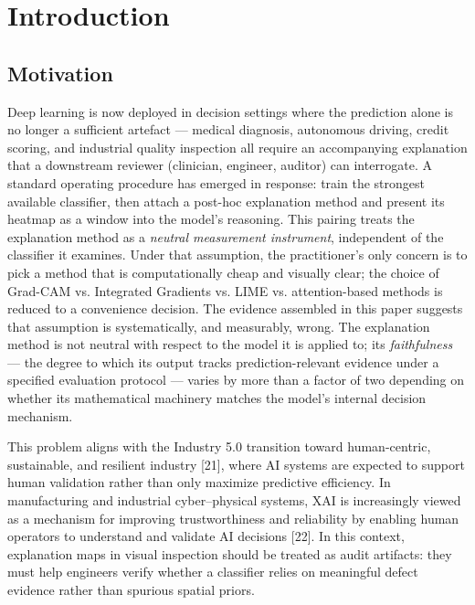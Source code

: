 \documentclass[11pt,a4paper]{article}
\begin{document}
\section{Introduction}

\subsection{Motivation}

Deep learning is now deployed in decision settings where the prediction alone is no longer a sufficient artefact --- medical diagnosis, autonomous driving, credit scoring, and industrial quality inspection all require an accompanying explanation that a downstream reviewer (clinician, engineer, auditor) can interrogate. A standard operating procedure has emerged in response: train the strongest available classifier, then attach a post-hoc explanation method and present its heatmap as a window into the model's reasoning. This pairing treats the explanation method as a \emph{neutral measurement instrument}, independent of the classifier it examines. Under that assumption, the practitioner's only concern is to pick a method that is computationally cheap and visually clear; the choice of Grad-CAM vs. Integrated Gradients vs. LIME vs. attention-based methods is reduced to a convenience
decision. The evidence assembled in this paper suggests that assumption is systematically, and measurably, wrong. The explanation method is not neutral with respect to the model it is applied to; its \emph{faithfulness} --- the degree to which its output tracks prediction-relevant evidence under a specified evaluation protocol --- varies by more than a factor of two depending on whether its mathematical machinery matches the model's internal decision mechanism.

This problem aligns with the Industry 5.0 transition toward human-centric, sustainable, and resilient industry [21], where AI systems are expected to support human validation rather than only maximize predictive efficiency. In manufacturing and industrial cyber--physical systems, XAI is increasingly viewed as a mechanism for improving trustworthiness and reliability by enabling human operators to understand and validate AI decisions [22]. In this context, explanation maps in visual inspection should be treated as audit artifacts: they must help engineers verify whether a classifier relies on meaningful defect evidence rather than spurious spatial priors.
\end{document}
